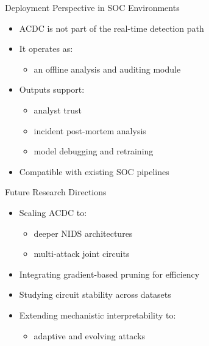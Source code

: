 \documentclass{beamer}
\begin{document}
	
	\begin{frame}{Deployment Perspective in SOC Environments}
		\begin{itemize}
			\item ACDC is not part of the real-time detection path
			\item It operates as:
			\begin{itemize}
				\item an offline analysis and auditing module
			\end{itemize}
			\item Outputs support:
			\begin{itemize}
				\item analyst trust
				\item incident post-mortem analysis
				\item model debugging and retraining
			\end{itemize}
			\item Compatible with existing SOC pipelines
		\end{itemize}
	\end{frame}
	
	\begin{frame}{Future Research Directions}
		\begin{itemize}
			\item Scaling ACDC to:
			\begin{itemize}
				\item deeper NIDS architectures
				\item multi-attack joint circuits
			\end{itemize}
			\item Integrating gradient-based pruning for efficiency
			\item Studying circuit stability across datasets
			\item Extending mechanistic interpretability to:
			\begin{itemize}
				\item adaptive and evolving attacks
			\end{itemize}
		\end{itemize}
	\end{frame}
	
\end{document}
